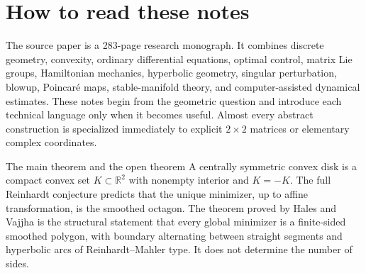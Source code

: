 \chapter*{How to read these notes}

The source paper is a 283-page research monograph. It combines discrete geometry, convexity, ordinary differential equations, optimal control, matrix Lie groups, Hamiltonian mechanics, hyperbolic geometry, singular perturbation, blowup, Poincaré maps, stable-manifold theory, and computer-assisted dynamical estimates. These notes begin from the geometric question and introduce each technical language only when it becomes useful. Almost every abstract construction is specialized immediately to explicit $2\times2$ matrices or elementary complex coordinates.

\begin{insightbox}{The main theorem and the open theorem}
A centrally symmetric convex disk is a compact convex set $K\subset\mathbb R^2$ with nonempty interior and $K=-K$. The full Reinhardt conjecture predicts that the unique minimizer, up to affine transformation, is the smoothed octagon. The theorem proved by Hales and Vajjha is the structural statement that every global minimizer is a finite-sided smoothed polygon, with boundary alternating between straight segments and hyperbolic arcs of Reinhardt--Mahler type. It does not determine the number of sides.
\end{insightbox}

